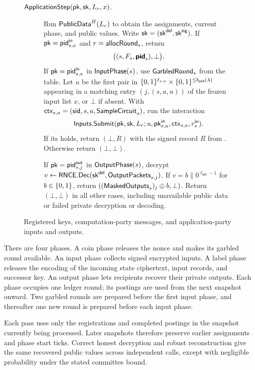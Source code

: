 \begin{figure}[!t]
{\begin{minipage}{0.95\textwidth}
\begin{description}
  \item[$\mathsf{ApplicationStep}(\mathsf{pk},\mathsf{sk},L_r,x)$.]
    Run $\mathsf{PublicData}^H(L_r)$ to obtain the assignments, current phase,
    and public values.
    Write $\mathsf{sk}=(\mathsf{sk}^{\mathsf{del}},\mathsf{sk}^{\mathsf{sig}})$.
    If $\mathsf{pk}=\mathsf{pid}^{\mathsf{in}}_{s,a}$ and $r=\mathsf{allocRound}_s$, return
    \[
      \bigl((s,F_s,\boldsymbol{\mathsf{pid}}_s),\bot\bigr).
    \]
    If $\mathsf{pk}=\mathsf{pid}^{\mathsf{in}}_{s,a}$ in $\mathsf{InputPhase}(s)$, use
    $\mathsf{GarbledRound}_s$ from the table.
    Let $u$ be the first pair in
    $\{0,1\}^{\ell_{s,a}}\times\{0,1\}^{\le b_{\mathsf{pub}}(\lambda)}$
    appearing in a matching entry $(j,(s,a,u))$ of the frozen input
    list $x$, or $\bot$ if absent.  With $\mathsf{ctx}_{s,a}=(\mathsf{sid},s,a,\mathsf{SampleCircuit}_s)$,
    run the interaction
    \[
      \mathsf{Inputs}.\mathsf{Submit}(\mathsf{pk},\mathsf{sk},L_r;
            u,\mathsf{pk}^{\mathsf{in}}_{s,a},\mathsf{ctx}_{s,a},r_s^{\mathsf{in}}).
    \]
    If its \emph{\WhenField} holds, return $(\bot,R)$ with the signed record
    $R$ from \emph{\WhatField}.  Otherwise return $(\bot,\bot)$.

    If $\mathsf{pk}=\mathsf{pid}^{\mathsf{out}}_{s,j}$ in $\mathsf{OutputPhase}(s)$, decrypt
    $v\gets\mathsf{RNCE}.\mathsf{Dec}(\mathsf{sk}^{\mathsf{del}},\mathsf{OutputPackets}_{s,j})$.
    If $v=b\mathbin\|0^{\ell_{\mathsf{del}}-1}$ for $b\in\{0,1\}$,
    return $((\mathsf{MaskedOutputs}_s)_j\oplus b,\bot)$.
    Return $(\bot,\bot)$ in all other cases, including unavailable
    public data or failed private decryption or decoding.
\end{description}
\end{minipage}}
\caption{Registered keys, computation-party messages, and application-party
inputs and outputs.}
\label{fig:protocol-steps}
\end{figure}

There are four phases.  A coin phase releases the nonce and makes its
garbled round available.  An input phase collects signed encrypted
inputs.  A label phase releases the encoding of the incoming state
ciphertext, input records, and successor key.  An output phase lets recipients
recover their private outputs.  Each phase occupies one ledger round;
its postings are used from the next snapshot onward.  Two garbled rounds
are prepared before the first input phase, and thereafter one new round
is prepared before each input phase.

Each pass uses only the registrations and completed postings in the
snapshot currently being processed.  Later snapshots therefore preserve
earlier assignments and phase start ticks.  Correct honest decryption
and robust reconstruction give the same recovered public values across
independent calls, except with negligible probability under the stated
committee bound.

